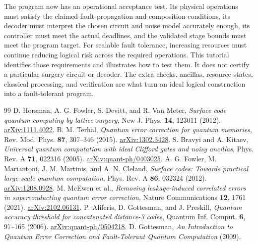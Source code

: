 \documentclass[11pt,a4paper]{article}
\begin{document}
The program now has an operational acceptance test. Its physical operations must satisfy the claimed fault-propagation and composition conditions, its decoder must interpret the chosen circuit and noise model accurately enough, its controller must meet the actual deadlines, and the validated stage bounds must meet the program target. For scalable fault tolerance, increasing resources must continue reducing logical risk across the required operations. This tutorial identifies those requirements and illustrates how to test them. It does not certify a particular surgery circuit or decoder. The extra checks, ancillas, resource states, classical processing, and verification are what turn an ideal logical construction into a fault-tolerant program.

\clearpage
\begin{thebibliography}{99}
\setlength{\itemsep}{4pt}
 D. Horsman, A. G. Fowler, S. Devitt, and R. Van Meter, \emph{Surface code quantum computing by lattice surgery}, New J. Phys. \textbf{14}, 123011 (2012).\newline
\href{https://arxiv.org/abs/1111.4022}{arXiv:1111.4022}.
 B. M. Terhal, \emph{Quantum error correction for quantum memories}, Rev. Mod. Phys. \textbf{87}, 307--346 (2015).\newline
\href{https://arxiv.org/abs/1302.3428}{arXiv:1302.3428}.
 S. Bravyi and A. Kitaev, \emph{Universal quantum computation with ideal Clifford gates and noisy ancillas}, Phys. Rev. A \textbf{71}, 022316 (2005).\newline
\href{https://arxiv.org/abs/quant-ph/0403025}{arXiv:quant-ph/0403025}.
 A. G. Fowler, M. Mariantoni, J. M. Martinis, and A. N. Cleland, \emph{Surface codes: Towards practical large-scale quantum computation}, Phys. Rev. A \textbf{86}, 032324 (2012).\newline
\href{https://arxiv.org/abs/1208.0928}{arXiv:1208.0928}.
 M. McEwen et al., \emph{Removing leakage-induced correlated errors in superconducting quantum error correction}, Nature Communications \textbf{12}, 1761 (2021).\newline
\href{https://arxiv.org/abs/2102.06131}{arXiv:2102.06131}.
 P. Aliferis, D. Gottesman, and J. Preskill, \emph{Quantum accuracy threshold for concatenated distance-3 codes}, Quantum Inf. Comput. \textbf{6}, 97--165 (2006).\newline
\href{https://arxiv.org/abs/quant-ph/0504218}{arXiv:quant-ph/0504218}.
 D. Gottesman, \emph{An Introduction to Quantum Error Correction and Fault-Tolerant Quantum Computation} (2009).\newline

\end{thebibliography}
\end{document}

